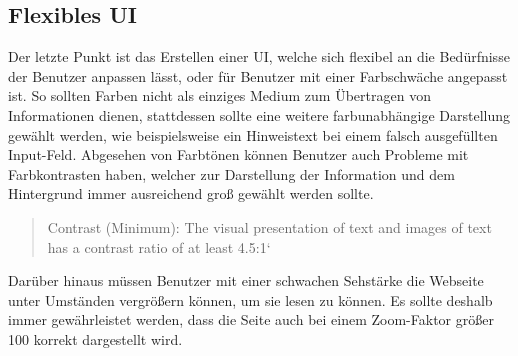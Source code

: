 \subsection{Flexibles UI}\label{flexibles-ui}

Der letzte Punkt ist das Erstellen einer \ac{UI}, welche sich flexibel an die Bedürfnisse der Benutzer anpassen lässt, oder für Benutzer mit einer Farbschwäche angepasst ist. So sollten Farben nicht als einziges Medium zum Übertragen von Informationen dienen, stattdessen sollte eine weitere farbunabhängige Darstellung gewählt werden, wie beispielsweise ein Hinweistext bei einem falsch ausgefüllten Input-Feld. Abgesehen von Farbtönen können Benutzer auch Probleme mit Farbkontrasten haben, welcher zur Darstellung der Information und dem Hintergrund immer ausreichend groß gewählt werden sollte.

\begin{quote}
Contrast (Minimum): The visual presentation of text and images of text has a contrast ratio of at least 4.5:1` \cite{citeulike:13915310}
\end{quote}

Darüber hinaus müssen Benutzer mit einer schwachen Sehstärke die Webseite unter Umständen vergrößern können, um sie lesen zu können. Es sollte deshalb immer gewährleistet werden, dass die Seite auch bei einem Zoom-Faktor größer 100 korrekt dargestellt wird.
